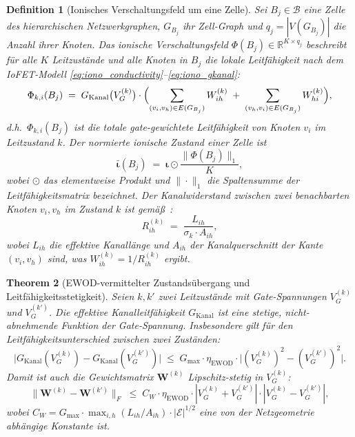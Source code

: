 \documentclass[12pt, a4paper, openany]{report}
\newtheorem{theorem}{Theorem}[chapter]
\newtheorem{definition}[theorem]{Definition}
\newcommand{\R}{\mathbb{R}}
\newcommand{\calE}{\mathcal{E}}
\newcommand{\calB}{\mathcal{B}}
\begin{document}
\begin{definition}[Ionisches Verschaltungsfeld um eine Zelle]
\label{def:ionic_field}
Sei $B_j \in \calB$ eine Zelle des hierarchischen Netzwerkgraphen,
$G_{B_j}$ ihr Zell-Graph und $q_j = |V(G_{B_j})|$ die Anzahl ihrer Knoten.
Das \emph{ionische Verschaltungsfeld}
$\Phi(B_j) \in \R^{K \times q_j}$ beschreibt für alle $K$ Leitzustände
und alle Knoten in $B_j$ die lokale Leitfähigkeit nach dem IoFET-Modell
\eqref{eq:iono_conductivity}--\eqref{eq:iono_gkanal}:
\[
  \Phi_{k,i}(B_j)
  \;=\;
  G_{\mathrm{Kanal}}\bigl(V_G^{(k)}\bigr) \cdot
  \Bigl(
    \sum_{(v_i, v_h) \in E(G_{B_j})} W^{(k)}_{ih}
    \;+\;
    \sum_{(v_h, v_i) \in E(G_{B_j})} W^{(k)}_{hi}
  \Bigr),
\]
d.h.\ $\Phi_{k,i}(B_j)$ ist die totale gate-gewichtete Leitfähigkeit
von Knoten $v_i$ im Leitzustand $k$.  Der normierte ionische Zustand
einer Zelle ist
\[
  \bar{\bm{\iota}}(B_j)
  \;=\; \bm{\iota} \odot \frac{\|\Phi(B_j)\|_1}{K},
\]
wobei $\odot$ das elementweise Produkt und $\|\cdot\|_1$ die Spaltensumme
der Leitfähigkeitsmatrix bezeichnet.  Der Kanalwiderstand zwischen zwei
benachbarten Knoten $v_i, v_h$ im Zustand $k$ ist gemäß~\cite{epp2026iono}:
\begin{equation}
  \label{eq:ionic_channel_resistance}
  R^{(k)}_{ih}
  \;=\; \frac{L_{ih}}{\sigma_k \cdot A_{ih}},
\end{equation}
wobei $L_{ih}$ die effektive Kanallänge und $A_{ih}$ der Kanalquerschnitt
der Kante $(v_i, v_h)$ sind, was $W^{(k)}_{ih} = 1 / R^{(k)}_{ih}$
ergibt.
\end{definition}

\begin{theorem}[EWOD-vermittelter Zustandsübergang und Leitfähigkeitsstetigkeit]
\label{thm:ionic_ewod_continuity}
Seien $k, k'$ zwei Leitzustände mit Gate-Spannungen $V_G^{(k)}$ und
$V_G^{(k')}$.  Die effektive Kanalleitfähigkeit $G_{\mathrm{Kanal}}$ ist
eine stetige, nicht-abnehmende Funktion der Gate-Spannung.  Insbesondere
gilt für den Leitfähigkeitsunterschied zwischen zwei Zuständen:
\begin{equation}
  \label{eq:ionic_ewod_diff}
  \bigl|G_{\mathrm{Kanal}}(V_G^{(k)}) - G_{\mathrm{Kanal}}(V_G^{(k')})\bigr|
  \;\leq\;
  G_{\max} \cdot \eta_{\mathrm{EWOD}} \cdot
  \bigl|(V_G^{(k)})^2 - (V_G^{(k')})^2\bigr|.
\end{equation}
Damit ist auch die Gewichtsmatrix $\bm{W}^{(k)}$ Lipschitz-stetig in $V_G^{(k)}$:
\begin{equation}
  \label{eq:ionic_w_lipschitz_vg}
  \|\bm{W}^{(k)} - \bm{W}^{(k')}\|_F
  \;\leq\;
  C_W \cdot \eta_{\mathrm{EWOD}} \cdot |V_G^{(k)} + V_G^{(k')}| \cdot
  |V_G^{(k)} - V_G^{(k')}|,
\end{equation}
wobei $C_W = G_{\max} \cdot \max_{i,h} (L_{ih}/A_{ih}) \cdot |\calE|^{1/2}$
eine von der Netzgeometrie abhängige Konstante ist.
\end{theorem}
\end{document}

